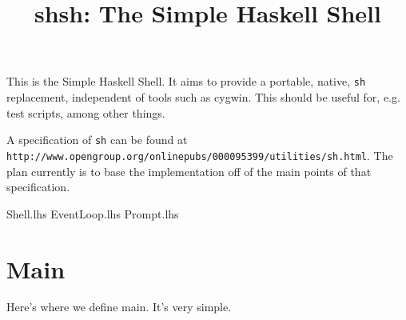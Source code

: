 \documentclass{memoir}
\title{shsh: The Simple Haskell Shell}
\begin{document}
\maketitle

This is the Simple Haskell Shell.  It aims to provide a portable,
native, \texttt{sh} replacement, independent of tools such as cygwin.
This should be useful for, e.g. test scripts, among other things.

A specification of \texttt{sh} can be found at
\texttt{http://www.opengroup.org/onlinepubs/000095399/utilities/sh.html}.
The plan currently is to base the implementation off of the main points
of that specification.

\let\inputHs\relax %

\inputHs Shell.lhs
\inputHs EventLoop.lhs
\inputHs Prompt.lhs

\chapter{Main}

Here's where we define main.  It's very simple.

\begin{code}

\end{code}
\end{document}
